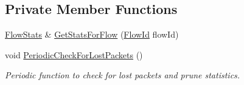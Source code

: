 \subsection*{Private Member Functions}
\begin{DoxyCompactItemize}
\item 
\hyperlink{structns3_1_1FlowMonitor_1_1FlowStats}{Flow\+Stats} \& \hyperlink{classns3_1_1FlowMonitor_a029346e25b6b7c0e70fe269e27739a7c}{Get\+Stats\+For\+Flow} (\hyperlink{group__flow-monitor_ga39a766c4a370cdb9ab8ac85da4b288e9}{Flow\+Id} flow\+Id)
\item 
void \hyperlink{classns3_1_1FlowMonitor_a93e1c1f73293fd11902697e700babc64}{Periodic\+Check\+For\+Lost\+Packets} ()
\begin{DoxyCompactList}\small\item\em Periodic function to check for lost packets and prune statistics. \end{DoxyCompactList}\end{DoxyCompactItemize}
